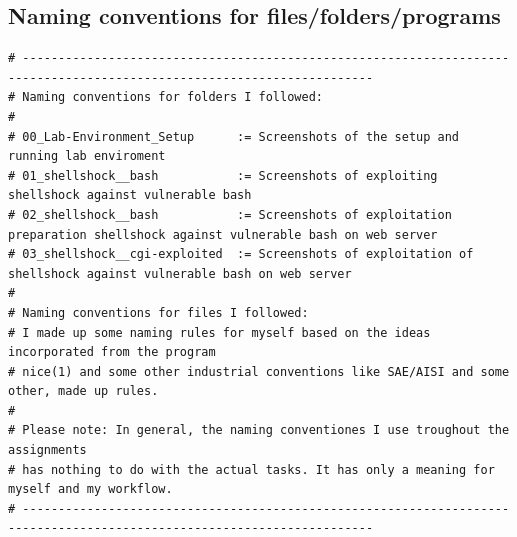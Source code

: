 \subsection{Naming conventions for files/folders/programs}
\label{apx:conventions}

\begin{verbatim}
# -----------------------------------------------------------------------------------------------------------------------
# Naming conventions for folders I followed:
#
# 00_Lab-Environment_Setup      := Screenshots of the setup and running lab enviroment
# 01_shellshock__bash           := Screenshots of exploiting shellshock against vulnerable bash
# 02_shellshock__bash           := Screenshots of exploitation preparation shellshock against vulnerable bash on web server
# 03_shellshock__cgi-exploited  := Screenshots of exploitation of shellshock against vulnerable bash on web server
#
# Naming conventions for files I followed:
# I made up some naming rules for myself based on the ideas incorporated from the program
# nice(1) and some other industrial conventions like SAE/AISI and some other, made up rules.
#
# Please note: In general, the naming conventiones I use troughout the assignments
# has nothing to do with the actual tasks. It has only a meaning for myself and my workflow.
# -----------------------------------------------------------------------------------------------------------------------
\end{verbatim}